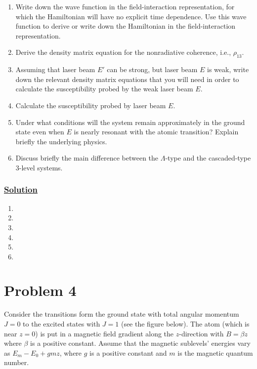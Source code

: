 \documentclass[12pt]{article}
\begin{document}
\begin{enumerate}[label=(\alph*)]
    \item Write down the wave function in the field-interaction representation, for which the Hamiltonian will have no explicit time dependence. Use this wave function to derive or write down the Hamiltonian in the field-interaction representation.
    \item Derive the density matrix equation for the nonradiative coherence, i.e., $\rho_{13}$.
    \item Assuming that laser beam $E'$ can be strong, but laser beam $E$ is weak, write down the relevant density matrix equations that you will need in order to calculate the susceptibility probed by the weak laser beam $E$.
    \item Calculate the susceptibility probed by laser beam $E$.
    \item Under what conditions will the system remain approximately in the ground state even when $E$ is nearly resonant with the atomic transition? Explain briefly the underlying physics.
    \item Discuss briefly the main difference between the $\Lambda$-type and the cascaded-type 3-level systems.
\end{enumerate}

\subsubsection*{\underline{Solution}}
\begin{enumerate}[label=(\alph*)]
    \item 
    \item 
    \item 
    \item 
    \item  
    \item 
\end{enumerate}


\section*{Problem 4}
Consider the transitions form the ground state with total angular momentum $J=0$ to the excited states with $J=1$ (see the figure below). The atom (which is near $z=0$) is put in a magnetic field gradient along the $z$-direction with $B=\beta z$ where $\beta$ is a positive constant. 
Assume that the magnetic sublevels' energies vary as $E_m - E_0 + gmz$, where $g$ is a positive constant and $m$ is the magnetic quantum number.
\end{document}
